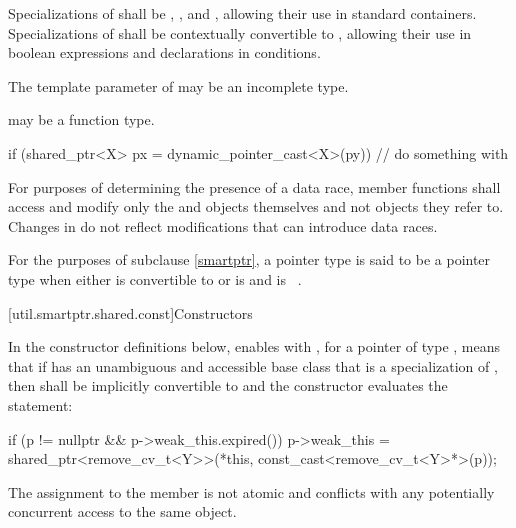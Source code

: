 \pnum
Specializations of  shall be ,
, and , allowing their use in standard
containers. Specializations of  shall be
contextually convertible to ,
allowing their use in boolean expressions and declarations in conditions.

\pnum
The template parameter  of 
may be an incomplete type.
\begin{note}
 may be a function type.
\end{note}

\pnum
\begin{example}
\begin{codeblock}
if (shared_ptr<X> px = dynamic_pointer_cast<X>(py)) {
  // do something with 
}
\end{codeblock}
\end{example}

\pnum
For purposes of determining the presence of a data race, member functions shall
access and modify only the  and  objects
themselves and not objects they refer to. Changes in  do not
reflect modifications that can introduce data races.

\pnum
For the purposes of subclause \ref{smartptr},
a pointer type  is said to be
a pointer type  when either
 is convertible to  or
 is  and  is \cv{}~.

[util.smartptr.shared.const]{Constructors}

\pnum
In the constructor definitions below,
enables  with ,
for a pointer  of type ,
means that if  has an unambiguous and accessible base class
that is a specialization of ,
then  shall be implicitly convertible to  and
the constructor evaluates the statement:
\begin{codeblock}
if (p != nullptr && p->weak_this.expired())
  p->weak_this = shared_ptr<remove_cv_t<Y>>(*this, const_cast<remove_cv_t<Y>*>(p));
\end{codeblock}
The assignment to the  member is not atomic and
conflicts with any potentially concurrent access to the same object.

